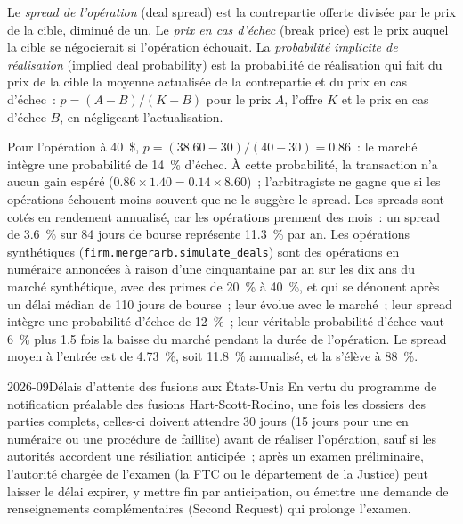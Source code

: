 \begin{definition}\label{def:s1:merger-arbitrage:spread}
Le \emph{spread de l'opération} (deal spread) est la contrepartie offerte divisée par le prix de la cible, diminué de un. Le \emph{prix en cas d'échec} (break price)
est le prix auquel la cible se négocierait si l'opération échouait. La \emph{probabilité implicite de réalisation} (implied deal probability) est la
probabilité de réalisation qui fait du prix de la cible la moyenne actualisée de la contrepartie et du prix en cas d'échec~: $p = (A - B)/(K - B)$ pour le prix $A$, l'offre $K$
et le prix en cas d'échec $B$, en négligeant l'actualisation.
\end{definition}

Pour l'opération à 40~\$, $p = (38.60 - 30)/(40 - 30) = 0.86$~: le marché intègre une probabilité de 14~\% d'échec. À cette probabilité, la transaction n'a aucun gain espéré
($0.86 \times 1.40 = 0.14 \times 8.60$)~; l'arbitragiste ne gagne que si les opérations échouent moins souvent que ne le suggère le spread. Les spreads sont cotés en rendement annualisé, car
les opérations prennent des mois~: un spread de 3.6~\% sur 84 jours de bourse représente 11.3~\% par an. Les opérations synthétiques (\texttt{firm.mergerarb.simulate\_deals}) sont des opérations en numéraire
annoncées à raison d'une cinquantaine par an sur les dix ans du marché synthétique, avec des primes de 20~\% à 40~\%, et qui se dénouent après un délai médian de 110 jours de bourse~; leur 
évolue avec le marché~; leur spread intègre une probabilité d'échec de 12~\%~; leur véritable probabilité d'échec vaut 6~\% plus 1.5 fois la baisse du marché pendant la
durée de l'opération. Le spread moyen à l'entrée est de 4.73~\%, soit 11.8~\% annualisé, et la  s'élève à 88~\%.

\begin{dated}{2026-09}{Délais d'attente des fusions aux États-Unis}\label{dat:s1:merger-arbitrage:hsr}
En vertu du programme de notification préalable des fusions Hart-Scott-Rodino, une fois les dossiers des parties complets, celles-ci doivent attendre 30 jours (15 jours pour une  en numéraire
ou une procédure de faillite) avant de réaliser l'opération, sauf si les autorités accordent une résiliation anticipée~; après un examen préliminaire, l'autorité chargée de l'examen (la FTC ou le
département de la Justice) peut laisser le délai expirer, y mettre fin par anticipation, ou émettre une demande de renseignements complémentaires (Second Request) qui prolonge l'examen.
\end{dated}

